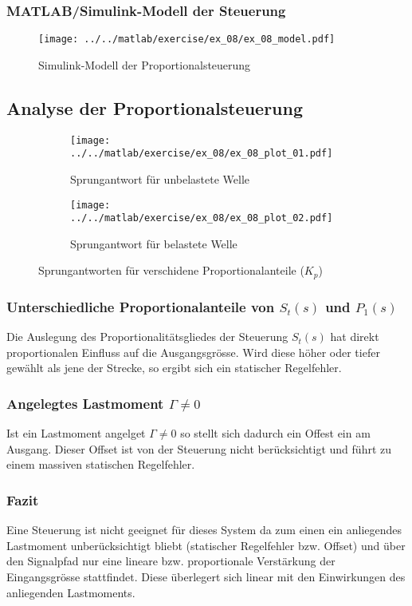 \subsubsection{MATLAB/Simulink-Modell der Steuerung}



\begin{figure}[h!]
	\centering
	\texttt{[image: ../../matlab/exercise/ex\_08/ex\_08\_model.pdf]}
	\caption{Simulink-Modell der Proportionalsteuerung}
\end{figure}

\subsection{Analyse der Proportionalsteuerung}

\begin{figure}[h!]
	\centering
	\begin{subfigure}{0.45\textwidth}
		\texttt{[image: ../../matlab/exercise/ex\_08/ex\_08\_plot\_01.pdf]}
		\caption{Sprungantwort für unbelastete Welle}
	\end{subfigure}
	\hfill{}
	\begin{subfigure}{0.45\textwidth}
		\texttt{[image: ../../matlab/exercise/ex\_08/ex\_08\_plot\_02.pdf]}
		\caption{Sprungantwort für belastete Welle}
	\end{subfigure}
	\caption{Sprungantworten für verschidene Proportionalanteile ($K_p$)}
\end{figure}

\subsubsection{Unterschiedliche Proportionalanteile von $S_t(s)$ und $P_1(s)$}
Die Auslegung des Proportionalitätsgliedes der Steuerung $S_t(s)$ hat direkt
proportionalen Einfluss auf die Ausgangsgrösse. Wird diese höher oder tiefer
gewählt als jene der Strecke, so ergibt sich ein statischer Regelfehler.

\subsubsection{Angelegtes Lastmoment $\Gamma \neq 0$}
Ist ein Lastmoment angelget $\Gamma \neq 0$ so stellt sich dadurch ein Offest
ein am Ausgang. Dieser Offset ist von der Steuerung nicht berücksichtigt und
führt zu einem massiven statischen Regelfehler.

\subsubsection{Fazit}
Eine Steuerung ist nicht geeignet für dieses System da zum einen ein
anliegendes Lastmoment unberücksichtigt bliebt (statischer Regelfehler bzw.
Offset) und über den Signalpfad nur eine lineare bzw. proportionale
Verstärkung der Eingangsgrösse stattfindet. Diese überlegert sich linear mit
den Einwirkungen des anliegenden Lastmoments.
